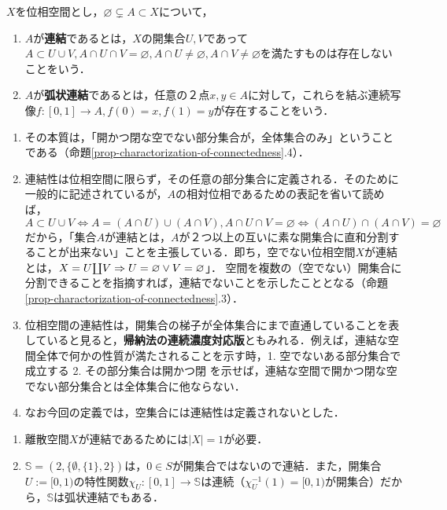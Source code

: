 \documentclass[uplatex,dvipdfmx]{jsreport}
\begin{document}
\begin{definition}[connected]\label{def-連結性}
    $X$を位相空間とし，$\varnothing\subsetneq A\subset X$について，
    \begin{enumerate}
        \item $A$が\textbf{連結}であるとは，$X$の開集合$U,V$であって$A\subset U\cup V,A\cap U\cap V=\varnothing, A\cap U\ne\varnothing, A\cap V\ne\varnothing$を満たすものは存在しないことをいう．
        \item $A$が\textbf{弧状連結}であるとは，任意の２点$x,y\in A$に対して，これらを結ぶ連続写像$f:[0,1]\to A, f(0)=x, f(1)=y$が存在することをいう．
    \end{enumerate}
\end{definition}
\begin{remark}[連結性とは何か]\mbox{}
    \begin{enumerate}
        \item その本質は，「開かつ閉な空でない部分集合が，全体集合のみ」ということである（命題\ref{prop-charactorization-of-connectedness}.4）．
        \item 連結性は位相空間に限らず，その任意の部分集合に定義される．そのために一般的に記述されているが，$A$の相対位相であるための表記を省いて読めば，$A\subset U\cup V\Leftrightarrow A=(A\cap U)\cup(A\cap V), A\cap U\cap V=\varnothing\Leftrightarrow (A\cap U)\cap(A\cap V)=\varnothing$だから，「集合$A$が連結とは，$A$が２つ以上の互いに素な開集合に直和分割することが出来ない」ことを主張している．即ち，空でない位相空間$X$が連結とは，$X=U\rotatebox[origin=c]{180}{$\prod$}V\Rightarrow U=\varnothing\lor V=\varnothing$」．
        空間を複数の（空でない）開集合に分割できることを指摘すれば，連結でないことを示したこととなる（命題\ref{prop-charactorization-of-connectedness}.3）．
        \item 位相空間の連結性は，開集合の梯子が全体集合にまで直通していることを表していると見ると，\textbf{帰納法の連続濃度対応版}ともみれる．例えば，連結な空間全体で何かの性質が満たされることを示す時，1. 空でないある部分集合で成立する 2. その部分集合は開かつ閉 を示せば，連結な空間で開かつ閉な空でない部分集合とは全体集合に他ならない．
        \item なお今回の定義では，空集合には連結性は定義されないとした．
    \end{enumerate}
\end{remark}

\begin{example}\mbox{}
    \begin{enumerate}
        \item 離散空間$X$が連結であるためには$|X|=1$が必要．
        \item $\mathbb{S}=(2,\{\emptyset,\{1\},2\})$は，$0\in S$が開集合ではないので連結．また，開集合$U:=[0,1)$の特性関数$\chi_U:[0,1]\to\mathbb{S}$は連続（$\chi_U^{-1}(1)=[0,1)$が開集合）だから，$\mathbb{S}$は弧状連結でもある．
    \end{enumerate}
\end{example}
\end{document}
